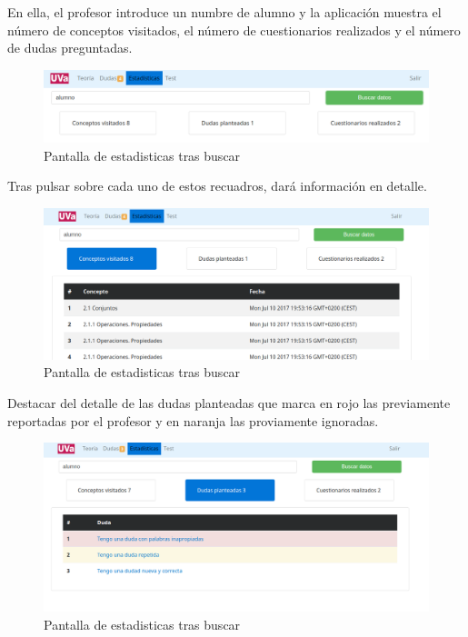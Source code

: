 \documentclass[openright,twoside,10pt]{book}
\begin{document}
    En ella, el profesor introduce un numbre de alumno y la aplicación
    muestra el número de conceptos visitados, el número de cuestionarios
    realizados y el número de dudas preguntadas.
    
    \begin{figure}[H]
        \begin{center}
            \includegraphics[width=\textwidth]{img/manual/profesor-estadisticas2.png}
        \end{center}
        \caption{Pantalla de estadisticas tras buscar}
    \end{figure}
    
    Tras pulsar sobre cada uno de estos recuadros, dará información en
    detalle.
    
    \begin{figure}[H]
        \begin{center}
            \includegraphics[width=\textwidth]{img/manual/profesor-estadisticas-detalle1.png}
        \end{center}
        \caption{Pantalla de estadisticas tras buscar}
    \end{figure}
    
    Destacar del detalle de las dudas planteadas que marca en rojo las
    previamente reportadas por el profesor y en naranja las proviamente
    ignoradas.
    
    \begin{figure}[H]
        \begin{center}
            \includegraphics[width=\textwidth]{img/manual/profesor-estadisticas-detalle2.png}
        \end{center}
        \caption{Pantalla de estadisticas tras buscar}
    \end{figure}
    
\end{document}
